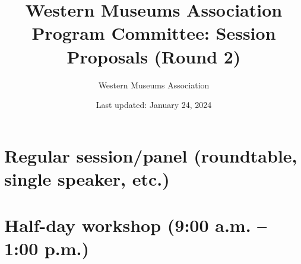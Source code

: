 \documentclass{report}
\title{ Western Museums Association Program Committee: Session Proposals (Round 2)}
\date{ Last updated: January 24, 2024}
\author{Western Museums Association}
\begin{document}
  \maketitle
  \newpage
  \tableofcontents
  \newpage
  
    \newpage
    \chapter*{ Regular session/panel (roundtable, single speaker, etc.) }

      
        
    \newpage
    \chapter*{ Half-day workshop (9:00 a.m. – 1:00 p.m.) }

      
        
\end{document}
